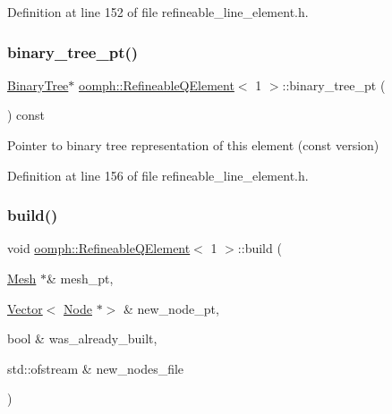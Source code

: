 Definition at line 152 of file refineable\+\_\+line\+\_\+element.\+h.

\mbox{\label{classoomph_1_1RefineableQElement_3_011_01_4_a39eca6ab43fcda520c1d9d17c907ccf2}} 
\subsubsection{\texorpdfstring{binary\+\_\+tree\+\_\+pt()}{binary\_tree\_pt()}\hspace{0.1cm}{\footnotesize\ttfamily [2/2]}}
{\footnotesize\ttfamily \hyperlink{classoomph_1_1BinaryTree}{Binary\+Tree}$\ast$ \hyperlink{classoomph_1_1RefineableQElement}{oomph\+::\+Refineable\+Q\+Element}$<$ 1 $>$\+::binary\+\_\+tree\+\_\+pt (\begin{DoxyParamCaption}{ }\end{DoxyParamCaption}) const\hspace{0.3cm}{\ttfamily [inline]}}



Pointer to binary tree representation of this element (const version) 



Definition at line 156 of file refineable\+\_\+line\+\_\+element.\+h.

\mbox{\label{classoomph_1_1RefineableQElement_3_011_01_4_aa2104bae648ac4b34caecbbb5fb254dc}} 
\subsubsection{\texorpdfstring{build()}{build()}}
{\footnotesize\ttfamily void \hyperlink{classoomph_1_1RefineableQElement}{oomph\+::\+Refineable\+Q\+Element}$<$ 1 $>$\+::build (\begin{DoxyParamCaption}\item[{\hyperlink{classoomph_1_1Mesh}{Mesh} $\ast$\&}]{mesh\+\_\+pt,  }\item[{\hyperlink{classoomph_1_1Vector}{Vector}$<$ \hyperlink{classoomph_1_1Node}{Node} $\ast$$>$ \&}]{new\+\_\+node\+\_\+pt,  }\item[{bool \&}]{was\+\_\+already\+\_\+built,  }\item[{std\+::ofstream \&}]{new\+\_\+nodes\+\_\+file }\end{DoxyParamCaption})\hspace{0.3cm}{\ttfamily [virtual]}}



